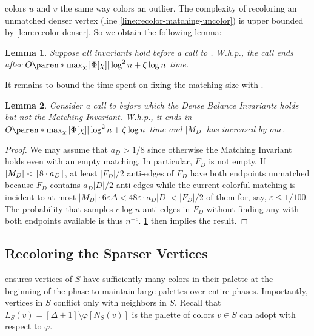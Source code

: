 \documentclass[a4paper,english,11pt]{amsart}
\newtheorem{lemma}{Lemma}[section]
\theoremstyle{definition}
\renewcommand{\leq}{\leqslant}
\DeclarePairedDelimiter{\paren}()
\DeclarePairedDelimiter{\floor}{\lfloor}{\rfloor}
\newcommand{\eps}{\varepsilon}
\newcommand{\col}{\varphi}
\newcommand{\NS}{N_{S}}
\newcommand{\LS}{L_{S}}
\begin{document}
\RecolorMatching colors $u$ and $v$ the same way \RecolorDense colors an outlier. The complexity of recoloring an unmatched denser vertex (line \ref{line:recolor-matching-uncolor}) is upper bounded by \cref{lem:recolor-denser}. So we obtain the following lemma:
\begin{lemma}
    \label{lem:recolor-matching}
    Suppose all invariants hold before a call to . W.h.p., the call ends after
    $O\paren*{ \max_{\chi} |\Phi[\chi]| \log^2 n + \zeta \log n }$
    time.
\end{lemma}

It remains to bound the time spent on fixing the matching size with \AddAntiEdgeMatching.
\begin{lemma}
    \label{lem:increase-matching-time}
    Consider a call to  before which the Dense Balance Invariants holds but not the Matching Invariant. W.h.p., it ends in
    $O\paren*{ \max_{\chi} |\Phi[\chi]| \log^2 n + \zeta \log n }$
    time and $|M_D|$ has increased by one.
\end{lemma}
\begin{proof}
We may assume that $a_D > 1/8$ since otherwise the Matching Invariant holds even with an empty matching. In particular, $F_D$ is not empty.
If $|M_D| < \floor*{ 8 \cdot a_D }$, at least $|F_D|/2$ anti-edges of $F_D$ have both endpoints unmatched because $F_D$ contains $a_D |D|/2$ anti-edges while the current colorful matching is incident to at most $|M_D| \cdot 6\eps\Delta < 48\eps \cdot a_D|D| < |F_D|/2$ of them for, say, $\eps \leq 1/100$. The probability that \AddAntiEdgeMatching samples $c\log n$ anti-edges in $F_D$ without finding any with both endpoints available is thus $n^{-c}$. \cref{lem:recolor-matching} then implies the result.
\end{proof}


\subsection{Recoloring the Sparser Vertices}
\label{sec:sparser}

\FreshColoring ensures vertices of $S$ have sufficiently many colors in their palette at the beginning of the phase to maintain large palettes over entire phases. Importantly, vertices in $S$ conflict only with neighbors in $S$.
Recall that $\LS(v) = [\Delta + 1] \setminus \col[\NS(v)]$ is the palette of colors $v\in S$ can adopt with respect to $\col$.
\end{document}
